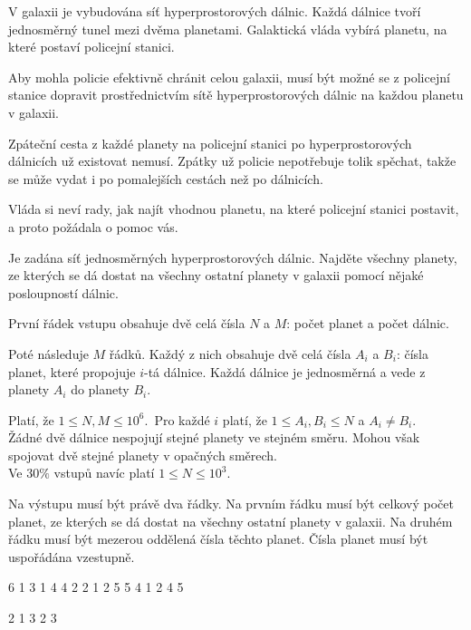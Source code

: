 





V galaxii je vybudována síť hyperprostorových dálnic.
Každá dálnice tvoří jednosměrný tunel mezi dvěma planetami.
Galaktická vláda vybírá planetu, na které postaví policejní stanici.

Aby mohla policie efektivně chránit celou galaxii, musí být možné se
z policejní stanice dopravit prostřednictvím sítě hyperprostorových
dálnic na každou planetu v galaxii.

Zpáteční cesta z každé planety na policejní stanici po
hyperprostorových dálnicích už existovat nemusí. Zpátky už policie
nepotřebuje tolik spěchat, takže se může vydat i po pomalejších cestách
než po dálnicích.

Vláda si neví rady, jak najít vhodnou planetu, na které policejní stanici
postavit, a proto požádala o pomoc vás.


Je zadána síť jednosměrných hyperprostorových dálnic. Najděte všechny
planety, ze kterých se dá dostat na všechny ostatní planety v galaxii
pomocí nějaké posloupností dálnic.


První řádek vstupu obsahuje dvě celá čísla $N$ a $M$: počet planet a počet dálnic.

Poté následuje $M$ řádků. Každý z nich obsahuje dvě celá čísla $A_i$ a $B_i$: čísla
planet, které propojuje $i$-tá dálnice. Každá dálnice je jednosměrná a vede z planety
$A_i$ do planety $B_i$.

\bigskip
\noindent
Platí, že $1 \leq N, M \leq 10^6$.\
Pro každé $i$ platí, že $1 \leq A_i, B_i \leq N$ a $A_i \neq B_i$.\\
Žádné dvě dálnice nespojují stejné planety ve stejném směru. Mohou však spojovat dvě
stejné planety v opačných směrech.\\
Ve $30\%$ vstupů navíc platí $1 \leq N \leq 10^3$.


Na výstupu musí být právě dva řádky. Na prvním řádku musí být celkový počet planet, ze
kterých se dá dostat na všechny ostatní planety v galaxii. Na druhém řádku musí být
mezerou oddělená čísla těchto planet. Čísla planet musí být uspořádána vzestupně.


 6
1 3
1 4
4 2
2 1
2 5
5 4
1 2 4 5
\sampleEND

 2
1 3
2 3

\sampleEND


